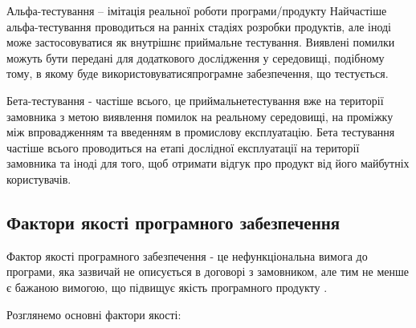 Альфа-тестування – імітація реальної роботи програми/продукту
Найчастіше альфа-тестування проводиться на ранніх стадіях
розробки продуктів, але іноді може застосовуватися як внутрішнє
приймальне тестування. Виявлені помилки можуть бути
передані для додаткового дослідження у середовищі, подібному
тому, в якому буде використовуватисяпрограмне забезпечення, що тестується.

Бета-тестування - частіше всього, це приймальнетестування
вже на території замовника з метою виявлення помилок
на реальному середовищі, на проміжку між впровадженням
та введенням в промислову експлуатацію. Бета тестування
частіше всього проводиться на етапі дослідної експлуатації
на території замовника та іноді для того, щоб отримати
відгук про продукт від його майбутніх користувачів.

\subsection{Фактори якості програмного забезпечення}

Фактор якості програмного забезпечення - це нефункціональна
вимога до програми, яка зазвичай не описується в договорі
з замовником, але тим не менше є бажаною вимогою, що підвищує
якість програмного продукту \cite{os-development,testing-black,test-automation-article}.

Розглянемо основні фактори якості:

